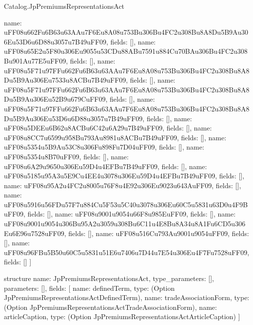 \begin{lexlean}{Catalog.JpPremiumsRepresentationsAct}
\begin{semanticmodule}
{    {name: uFF08u662Fu6B63u63AAu7F6Eu8A08u753Bu306Bu4FC2u308Bu8A8Du5B9Au306Eu53D6u6D88u3057u7B49uFF09, fields: []},
    {name: uFF08u65E2u5F80u306Eu9055u53CDu88ABu7591u884Cu70BAu306Bu4FC2u308Bu901Au77E5uFF09, fields: []},
    {name: uFF08u5F71u97FFu662Fu6B63u63AAu7F6Eu8A08u753Bu306Bu4FC2u308Bu8A8Du5B9Au306Eu7533u8ACBu7B49uFF09, fields: []},
    {name: uFF08u5F71u97FFu662Fu6B63u63AAu7F6Eu8A08u753Bu306Bu4FC2u308Bu8A8Du5B9Au306Eu52B9u679CuFF09, fields: []},
    {name: uFF08u5F71u97FFu662Fu6B63u63AAu7F6Eu8A08u753Bu306Bu4FC2u308Bu8A8Du5B9Au306Eu53D6u6D88u3057u7B49uFF09, fields: []},
    {name: uFF08u5DEEu6B62u8ACBu6C42u6A29u7B49uFF09, fields: []},
    {name: uFF08u8CC7u6599u958Bu793Au8981u8ACBu7B49uFF09, fields: []},
    {name: uFF08u5354u5B9Au53C8u306Fu898Fu7D04uFF09, fields: []},
    {name: uFF08u5354u8B70uFF09, fields: []},
    {name: uFF08u6A29u9650u306Eu59D4u4EFBu7B49uFF09, fields: []},
    {name: uFF08u5185u95A3u5E9Cu4EE4u3078u306Eu59D4u4EFBu7B49uFF09, fields: []},
    {name: uFF08u95A2u4FC2u8005u76F8u4E92u306Eu9023u643AuFF09, fields: []},
    {name: uFF08u5916u56FDu57F7u884Cu5F53u5C40u3078u306Eu60C5u5831u63D0u4F9BuFF09, fields: []},
    {name: uFF08u9001u9054u66F8u985EuFF09, fields: []},
    {name: uFF08u9001u9054u306Bu95A2u3059u308Bu6C11u4E8Bu8A34u8A1Fu6CD5u306Eu6E96u7528uFF09, fields: []},
    {name: uFF08u516Cu793Au9001u9054uFF09, fields: []},
    {name: uFF08u96FBu5B50u60C5u5831u51E6u7406u7D44u7E54u306Eu4F7Fu7528uFF09, fields: []}
  ]
}

structure{
  name: JpPremiumsRepresentationsAct,
  type_parameters: [],
  parameters: [],
  fields: [
    {name: definedTerm, type: (Option JpPremiumsRepresentationsActDefinedTerm)},
    {name: tradeAssociationForm, type: (Option JpPremiumsRepresentationsActTradeAssociationForm)},
    {name: articleCaption, type: (Option JpPremiumsRepresentationsActArticleCaption)}
  ]
}
\end{semanticmodule}
\end{lexlean}
